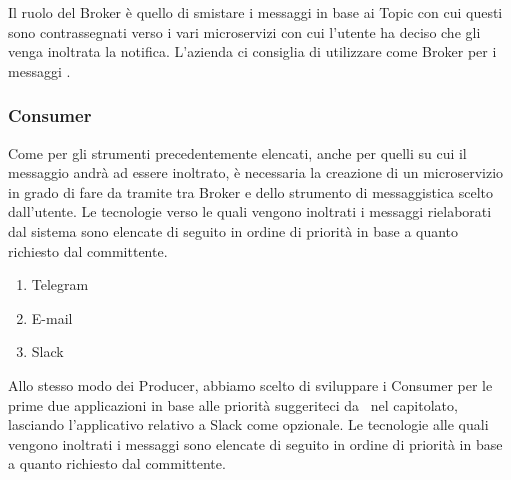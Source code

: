 		Il ruolo del Broker è quello di smistare i messaggi in base ai Topic con cui questi sono contrassegnati verso i vari microservizi con cui l'utente ha deciso che gli venga inoltrata la notifica.
		L'azienda ci consiglia di utilizzare come Broker per i messaggi .
	
	
	\subsubsection{Consumer}\label{TecnologieConsumer}
		Come per gli strumenti precedentemente elencati, anche per quelli su cui il messaggio andrà ad essere inoltrato, è necessaria la creazione di un microservizio in grado di fare da tramite tra Broker e  dello strumento di messaggistica scelto dall'utente.
		Le tecnologie verso le quali vengono inoltrati i messaggi rielaborati dal sistema sono elencate di seguito in ordine di priorità in base a quanto richiesto dal committente.
		\begin{enumerate}
			\item Telegram
			\item E-mail
			\item Slack
		\end{enumerate}
		Allo stesso modo dei Producer, abbiamo scelto di sviluppare i Consumer per le prime due applicazioni in base alle priorità suggeriteci da \II\ nel capitolato, lasciando l'applicativo relativo a Slack come opzionale.
		Le tecnologie alle quali vengono inoltrati i messaggi sono elencate di seguito in ordine di priorità in base a quanto richiesto dal committente.
			
		
	
